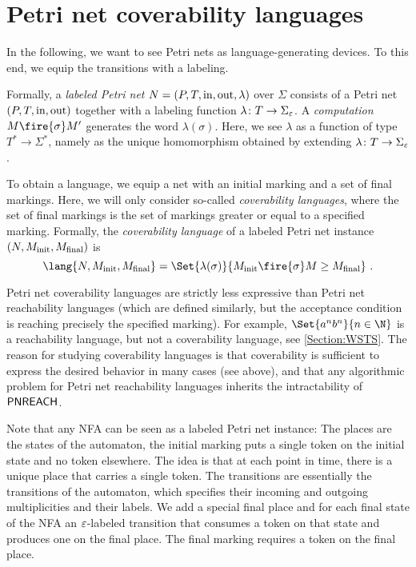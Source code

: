 \documentclass[../../diss.tex]{subfiles}
\begin{document}
\section{Petri net coverability languages}%
\label{Section:PNCovLang}%

In the following, we want to see Petri nets as language-generating devices.
To this end, we equip the transitions with a labeling.

    Formally, a \emph{labeled Petri net} $N = (P,T,\text{in},\text{out},\lambda)$ over $\Sigma$ consists of a Petri net $(P,T,\text{in},\text{out})$ together with a labeling function $\lambda \colon T \to \Sigma_\varepsilon$.
%
A \emph{computation} $M \fire{\sigma} M'$ generates the word $\lambda(\sigma)$.
Here, we see $\lambda$ as a function of type $T^* \to \Sigma^*$, namely as the unique homomorphism obtained by extending $\lambda \colon T \to \Sigma_\varepsilon$.

To obtain a language, we equip a net with an initial marking and a set of final markings.
Here, we will only consider so-called \emph{coverability languages}, where the set of final markings is the set of markings greater or equal to a specified marking.
Formally, the  \emph{coverability language} of a labeled Petri net instance $(N,M_{\text{init}},M_{\text{final}})$ is
\[
    \lang{N,\Minit,\Mfinal} = \Set{ \lambda(\sigma) }{ \Minit \fire{\sigma} M \geq \Mfinal }
    \ .
\]

Petri net coverability languages are strictly less expressive than Petri net reachability languages (which are defined similarly, but the acceptance condition is reaching precisely the specified marking).
For example, $\Set{a^n b^n}{ n \in \N}$ is a reachability language, but not a coverability language, see \cref{Section:WSTS}.
The reason for studying coverability languages is that coverability is sufficient to express the desired behavior in many cases (see above), and that any algorithmic problem for Petri net reachability languages inherits the intractability of $\mathsf{PNREACH}$.

\begin{example}%
\label{Example:RegularPNCOV}%
    Note that any NFA can be seen as a labeled Petri net instance:
    The places are the states of the automaton, the initial marking puts a single token on the initial state and no token elsewhere.
    The idea is that at each point in time, there is a unique place that carries a single token.
    The transitions are essentially the transitions of the automaton, which specifies their incoming and outgoing multiplicities and their labels.
    We add a special final place and for each final state of the NFA an $\varepsilon$-labeled transition that consumes a token on that state and produces one on the final place.
    The final marking requires a token on the final place.
\end{example}
\end{document}
